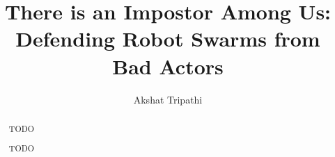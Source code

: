\documentclass[a4paper, twoside]{report}
\title{There is an Impostor Among Us:\\Defending Robot Swarms from Bad Actors}
\author{Akshat Tripathi}
\begin{document}



\begin{abstract}
TODO
\end{abstract}

\renewcommand{\abstractname}{Acknowledgements}
\begin{abstract}
TODO
\end{abstract}

\tableofcontents
\listoffigures











\end{document}
